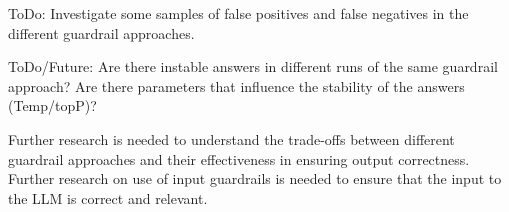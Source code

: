 %

ToDo: Investigate some samples of false positives and false negatives in the different guardrail approaches.

ToDo/Future: Are there instable answers in different runs of the same guardrail approach? Are there parameters that influence the stability of the answers (Temp/topP)?

Further research is needed to understand the trade-offs between different guardrail approaches and their effectiveness in ensuring output correctness.
Further research on use of input guardrails is needed to ensure that the input to the LLM is correct and relevant.